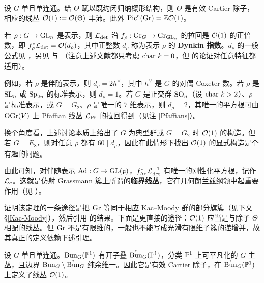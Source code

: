 \begin{thm}\label{Pic of Gr}
设 $G$ 单且单连通。给 $\Theta$ 赋以既约闭归纳概形结构，则 $\Theta$ 是有效 Cartier 除子，相应的线丛 ${\mathcal O}(1):={\mathcal O}(\Theta)$ 丰沛。此外 ${\operatorname{Pic}}^e({\operatorname{Gr}})={\mathbb Z}{\mathcal O}(1)$。
\end{thm}

\begin{rmk}\label{generator}
若 $\rho: G\to {\operatorname{GL}}_n$ 是表示，则 ${\mathcal L}_{\det}$ 沿 $f_\rho:{\operatorname{Gr}}_G\to {\operatorname{Gr}}_{{\operatorname{GL}}_n}$ 的拉回是 ${\mathcal O}(1)$ 的正倍数，即 $f_\rho^*{\mathcal L}_{\det}={\mathcal O}(d_\rho)$，其中正整数 $d_\rho$ 称为表示 $\rho$ 的 \textbf{Dynkin 指数}。$d_\rho$ 的一般公式见 \cite[Lemma 5.2]{KNR}，另见 \cite[Lemma 10.6.1]{So} 与 \cite[Lemma 4.2]{YZ}（注意上述文献都只考虑 ${\operatorname{char}}\ k=0$，但 \cite[Lemma 4.2]{YZ} 的论证对任意特征都适用）。

例如，若 $\rho$ 是伴随表示，则 $d_\rho=2h^\vee$，其中 $h^\vee$ 是 $G$ 的对偶 Coxeter 数。若 $\rho$ 是 ${\operatorname{SL}}_n$ 或 $\operatorname{Sp}_{2n}$ 的标准表示，则 $d_\rho=1$。若 $G$ 是正交群 $\operatorname{SO}_n$（设 $\cha\ k>2$）、$\rho$ 是标准表示，或 $G=G_2$、$\rho$ 是唯一的 $7$ 维表示，则 $d_\rho=2$，其唯一的平方根可由 $\operatorname{OGr}(V)$ 上 Pfaffian 线丛 ${\mathcal L}_{\operatorname{Pf}}$ 的拉回得到（见注 \ref{Pfaffians}）。

换个角度看，上述讨论本质上给出了 $G$ 为典型群或 $G=G_2$ 时 ${\mathcal O}(1)$ 的构造。但若 $G=E_8$，则对任意 $\rho$ 都有 $60\mid d_\rho$，因此在此情形下找出 ${\mathcal O}(1)$ 的显式构造是个有趣的问题。
\end{rmk}

\begin{rmk}\label{square root of adjoint}
由此可知，对伴随表示 ${\operatorname{Ad}}: G\to {\operatorname{GL}}({\mathfrak g})$，$f_{{\operatorname{Ad}}}^*{\mathcal L}^{-1}_{\det}$ 有唯一的刚性化平方根，记作 ${\mathcal L}_{c}$。这就是仿射 Grassmann 簇上所谓的\textbf{临界线丛}，它在几何朗兰兹纲领中起重要作用（见 \cite{BD}）。
\end{rmk}

证明该定理的一条途径是把 ${\operatorname{Gr}}$ 等同于相应 Kac--Moody 群的部分旗簇（见下文 \S\ref{Kac-Moody}），然后引用 \cite{Ma} 的结果。下面是更直接的途径：${\mathcal O}(1)$ 应当是与除子 $\Theta$ 相配的线丛。但 ${\operatorname{Gr}}$ 不是有限维的，一般也不能写成光滑有限维子簇的递增并，故其真正的定义依赖下述引理。

\begin{lem}\label{O1 on Bun}
设 $G$ 单且单连通。${\operatorname{Bun}}_G({\mathbb P}^1)$ 有开子叠 $\mathring{{\operatorname{Bun}}}_G({\mathbb P}^1)$，分类 ${\mathbb P}^1$ 上可平凡化的 $G$-主丛，且边界 ${\operatorname{Bun}}_G\setminus \mathring{{\operatorname{Bun}}}_G$ 纯余维一。因此它是有效 Cartier 除子，在 $\mathring{{\operatorname{Bun}}}_G({\mathbb P}^1)$ 上定义了线丛 ${\mathcal O}(1)$。
\end{lem}

